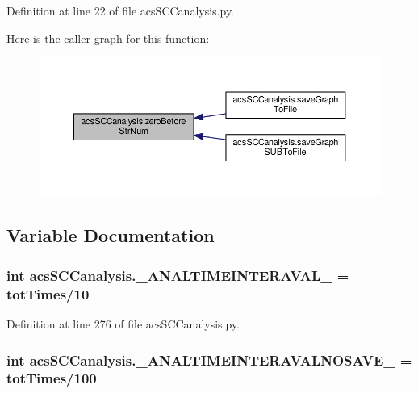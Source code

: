 Definition at line 22 of file acs\-S\-C\-Canalysis.\-py.



Here is the caller graph for this function\-:\nopagebreak
\begin{figure}[H]
\begin{center}
\leavevmode
\includegraphics[width=350pt]{a00097_ab46df2a2027edcf1b07fc012b691b9d6_icgraph}
\end{center}
\end{figure}




\subsection{Variable Documentation}
\hypertarget{a00097_a46f1fb71bdcdb1c8679ae847d0d4b63f}{
\subsubsection[{\-\_\-\-A\-N\-A\-L\-T\-I\-M\-E\-I\-N\-T\-E\-R\-A\-V\-A\-L\-\_\-}]{\setlength{\rightskip}{0pt plus 5cm}int acs\-S\-C\-Canalysis.\-\_\-\-A\-N\-A\-L\-T\-I\-M\-E\-I\-N\-T\-E\-R\-A\-V\-A\-L\-\_\- = {\bf tot\-Times}/10}}\label{a00097_a46f1fb71bdcdb1c8679ae847d0d4b63f}


Definition at line 276 of file acs\-S\-C\-Canalysis.\-py.

\hypertarget{a00097_a7665e828ed7f27f4ba353e9645ad716d}{
\subsubsection[{\-\_\-\-A\-N\-A\-L\-T\-I\-M\-E\-I\-N\-T\-E\-R\-A\-V\-A\-L\-N\-O\-S\-A\-V\-E\-\_\-}]{\setlength{\rightskip}{0pt plus 5cm}int acs\-S\-C\-Canalysis.\-\_\-\-A\-N\-A\-L\-T\-I\-M\-E\-I\-N\-T\-E\-R\-A\-V\-A\-L\-N\-O\-S\-A\-V\-E\-\_\- = {\bf tot\-Times}/100}}\label{a00097_a7665e828ed7f27f4ba353e9645ad716d}


